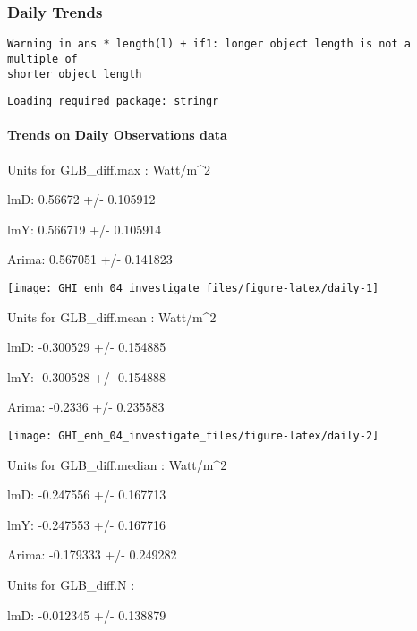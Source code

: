 \documentclass[
  10pt,
  a4paper,oneside]{article}
\begin{document}
\newpage
\FloatBarrier

\hypertarget{daily-trends}{%
\subsubsection{Daily Trends}\label{daily-trends}}

\begin{verbatim}
Warning in ans * length(l) + if1: longer object length is not a multiple of
shorter object length
\end{verbatim}

\newpage

\begin{verbatim}
Loading required package: stringr
\end{verbatim}

\hypertarget{trends-on-daily-observations-data}{%
\paragraph{Trends on Daily Observations data}\label{trends-on-daily-observations-data}}

Units for GLB\_diff.max : Watt/m\^{}2

lmD: 0.56672 +/- 0.105912

lmY: 0.566719 +/- 0.105914

Arima: 0.567051 +/- 0.141823

\begin{center}\texttt{[image: GHI\_enh\_04\_investigate\_files/figure-latex/daily-1]} \end{center}

Units for GLB\_diff.mean : Watt/m\^{}2

lmD: -0.300529 +/- 0.154885

lmY: -0.300528 +/- 0.154888

Arima: -0.2336 +/- 0.235583

\begin{center}\texttt{[image: GHI\_enh\_04\_investigate\_files/figure-latex/daily-2]} \end{center}

Units for GLB\_diff.median : Watt/m\^{}2

lmD: -0.247556 +/- 0.167713

lmY: -0.247553 +/- 0.167716

Arima: -0.179333 +/- 0.249282

Units for GLB\_diff.N :

lmD: -0.012345 +/- 0.138879
\end{document}
